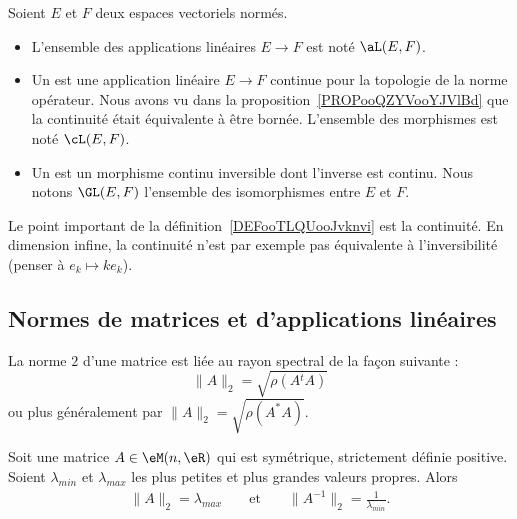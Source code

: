 \begin{definition}      \label{DEFooTLQUooJvknvi}
    Soient \( E\) et \( F\) deux espaces vectoriels normés.
    \begin{itemize}
        \item
            L'ensemble des applications linéaires \( E\to F\) est noté \( \aL(E,F)\).
        \item Un  est une application linéaire \( E\to F\) continue pour la topologie de la norme opérateur. Nous avons vu dans la proposition~\ref{PROPooQZYVooYJVlBd} que la continuité était équivalente à être bornée. L'ensemble des morphismes est noté \( \cL(E,F)\).
        \item
            Un  est un morphisme continu inversible dont l'inverse est continu. Nous notons \( \GL(E,F)\) l'ensemble des isomorphismes entre \( E\) et \( F\).
    \end{itemize}
\end{definition}

Le point important de la définition~\ref{DEFooTLQUooJvknvi} est la continuité. En dimension infine, la continuité n'est par exemple pas équivalente à l'inversibilité (penser à \( e_k\mapsto ke_k\)).

\subsection{Normes de matrices et d'applications linéaires}
\label{subsecNomrApplLin}

\begin{theorem}       \label{THOooNDQSooOUWQrK}
    La norme $2$ d'une matrice est liée au rayon spectral de la façon suivante :
    \begin{equation}
        \|A\|_2=\sqrt{\rho(A{^t}A)}
    \end{equation}
    ou plus généralement par \( \| A \|_2=\sqrt{\rho(A^*A)}\).
\end{theorem}

\begin{lemma}       \label{LEMooNESTooVvUEOv}
    Soit une matrice \( A\in \eM(n,\eR)\) qui est symétrique, strictement définie positive. Soient \( \lambda_{min}\) et \( \lambda_{max}\) les plus petites et plus grandes valeurs propres. Alors
    \begin{subequations}
        \begin{align}
            \| A \|_2=\lambda_{max}&&\text{ et }&&\|A^{-1}  \|_2=\frac{1}{ \lambda_{min} }.
        \end{align}
    \end{subequations}
\end{lemma}

